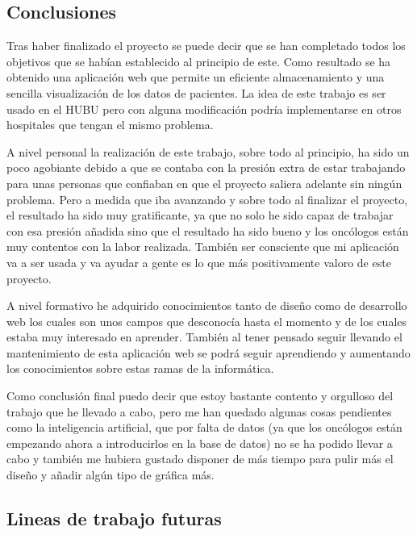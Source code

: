 
\subsection{Conclusiones}

Tras haber finalizado el proyecto se puede decir que se han completado todos los objetivos que se habían establecido al principio de este. Como resultado se ha obtenido una aplicación web que permite un eficiente almacenamiento y una sencilla visualización de los datos de pacientes. La idea de este trabajo es ser usado en el HUBU pero con alguna modificación podría implementarse en otros hospitales que tengan el mismo problema.

A nivel personal la realización de este trabajo, sobre todo al principio, ha sido un poco agobiante debido a que se contaba con la presión extra de estar trabajando para unas personas que confiaban en que el proyecto saliera adelante sin ningún problema. Pero a medida que iba avanzando y sobre todo al finalizar el proyecto, el resultado ha sido muy gratificante, ya que no solo he sido capaz de trabajar con esa presión añadida sino que el resultado ha sido bueno y los oncólogos están muy contentos con la labor realizada. También ser consciente que mi aplicación va a ser usada y va ayudar a gente es lo que más positivamente valoro de este proyecto.

A nivel formativo he adquirido conocimientos tanto de diseño como de desarrollo web los cuales son unos campos que desconocía hasta el momento y de los cuales estaba muy interesado en aprender. También al tener pensado seguir llevando el mantenimiento de esta aplicación web se podrá seguir aprendiendo y aumentando los conocimientos sobre estas ramas de la informática.

Como conclusión final puedo decir que estoy bastante contento y orgulloso del trabajo que he llevado a cabo, pero me han quedado algunas cosas pendientes como la inteligencia artificial, que por falta de datos (ya que los oncólogos están empezando ahora a introducirlos en la base de datos) no se ha podido llevar a cabo y también me hubiera gustado disponer de más tiempo para pulir más el diseño y añadir algún tipo de gráfica más. 

\subsection{Lineas de trabajo futuras}

